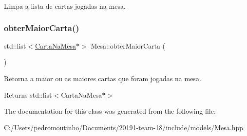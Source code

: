 Limpa a lista de cartas jogadas na mesa. 

\mbox{\label{class_mesa_a3c48d9d5efdc8b26956245abb4c568ef}} 
\subsubsection{\texorpdfstring{obterMaiorCarta()}{obterMaiorCarta()}}
{\footnotesize\ttfamily std\+::list$<$\mbox{\hyperlink{class_carta_na_mesa}{Carta\+Na\+Mesa}}$\ast$$>$ Mesa\+::obter\+Maior\+Carta (\begin{DoxyParamCaption}{ }\end{DoxyParamCaption})}



Retorna a maior ou as maiores cartas que foram jogadas na mesa. 

\begin{DoxyReturn}{Returns}
std\+::list$<$\+Carta\+Na\+Mesa$\ast$$>$ 
\end{DoxyReturn}


The documentation for this class was generated from the following file\+:\begin{DoxyCompactItemize}
\item 
C\+:/\+Users/pedromoutinho/\+Documents/20191-\/team-\/18/include/models/Mesa.\+hpp\end{DoxyCompactItemize}
